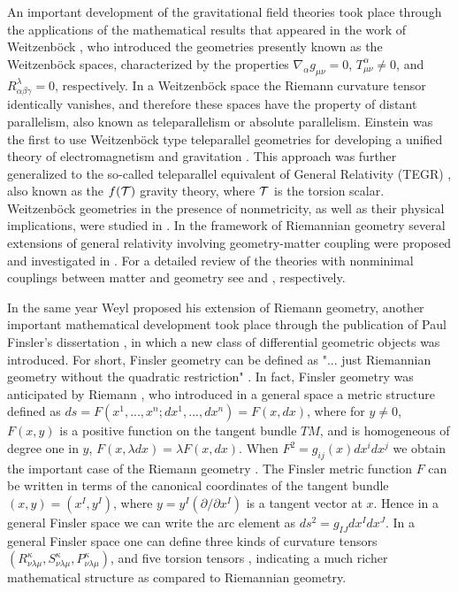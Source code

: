 \documentclass[aps,superscriptaddress, showpacs,preprintnumbers, superscriptaddress, nofootinbibt,twocolumn]{revtex4-2}
\begin{document}
An important development of the gravitational field theories took place through the applications of the mathematical results that appeared
in the work of Weitzenb\"{o}ck \cite{r11}, who introduced the geometries presently known as the
Weitzenb\"{o}ck spaces, characterized  by the properties $\nabla_ {\alpha }g_{\mu \nu}=0 $, $T_{\mu \nu}^{\alpha}\neq 0$, and $R_{\alpha \beta \gamma}^{\lambda}= 0$, respectively.  In a Weitzenb\"{o}ck space the Riemann curvature tensor identically vanishes, and therefore these spaces have the property of distant parallelism, also known as teleparallelism or absolute parallelism.  Einstein was the first to use Weitzenb\"{o}ck type teleparallel geometries for developing a unified theory of electromagnetism and gravitation \cite{r12}.  This approach was further generalized to the so-called teleparallel equivalent of General Relativity (TEGR) \cite{r13,r14,r15}, also known as the $f(\cal{T})$ gravity theory, where $\cal{T}$ is the torsion scalar. Weitzenb\"{o}ck geometries in the presence of nonmetricity, as well as their physical implications, were studied in \cite{r16,r17}. In the framework of Riemannian geometry several extensions of general relativity involving geometry-matter coupling were proposed and investigated in \cite{e1,e2,e3,e4,e5,e6,e7}. For a detailed review of the theories with nonminimal couplings between matter and geometry see \cite{e8} and \cite{e9}, respectively.

In the same year Weyl proposed his extension of Riemann geometry, another important mathematical development took place through the publication of Paul Finsler's dissertation \cite{F1}, in which a new class of differential geometric objects was introduced. For short, Finsler geometry can be defined as "... just Riemannian geometry without the quadratic restriction" \cite{F2}. In fact, Finsler geometry was anticipated by Riemann \cite{r1}, who introduced in a general space a metric structure defined as $ds=F\left(x^1,...,x^n; dx^1,...,dx^n\right)=F(x,dx)$, where for $y\neq 0$, $F(x, y)$ is a positive function
on the tangent bundle $TM$, and is homogeneous of degree one in $y$, $F(x,\lambda dx)=\lambda F(x,dx)$. When $F^2=g_{ij}(x)dx^idx^j$ we obtain the important case of the Riemann geometry \cite{F2}. The Finsler metric function $F$ can be written in terms of the canonical coordinates of
the tangent bundle $(x, y) = \left(x^I,y^I\right)$, where $y = y^I\left(\partial /\partial x^I\right)$ is a tangent vector at $x$. Hence in a general Finsler space we can write the arc element as $ds^2=g_{IJ}dx^Idx^J$. In a general Finsler space one can define three kinds of curvature tensors $\left(R_{\nu \lambda \mu}^{\kappa}, S_{\nu \lambda \mu}^{\kappa},P_{\nu \lambda \mu}^{\kappa} \right)$, and five torsion tensors \cite{Bao}, indicating a much richer mathematical structure as compared to Riemannian geometry.
\end{document}
